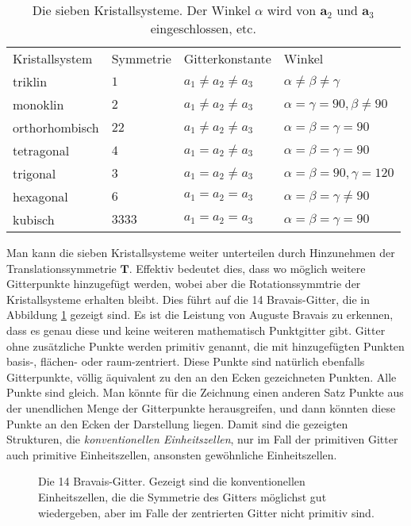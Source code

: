 \begin{table}
\begin{tabular}{llll}
Kristallsystem 	& 	Symmetrie & Gitterkonstante & Winkel \\
triklin 	&  	$1$						& $a_1 \neq a_2 \neq a_3$ &  $\alpha \neq \beta \neq \gamma$\\
monoklin 	& 	 $2$ 					& $a_1 \neq a_2 \neq a_3$ &  $\alpha = \gamma = 90, \beta \neq 90$\\
orthorhombisch 	& 	  $22$  & $a_1 \neq a_2 \neq a_3$ &  $\alpha= \beta =  \gamma = 90$\\
%
tetragonal 	&  $4$ & $a_1 = a_2 \neq a_3$ &   $\alpha= \beta =  \gamma = 90$\\
trigonal 	& 	 $3$ & $a_1 = a_2 \neq a_3$ &  $\alpha = \beta = 90, \gamma = 120$\\
hexagonal 	& 	  $6$  & $a_1 = a_2 = a_3$ &  $\alpha = \beta = \gamma \neq 90$\\
kubisch 	&  	$3333$  & $a_1= a_2=  a_3$ &  $\alpha= \beta =  \gamma = 90$\\
\end{tabular}
\caption{Die sieben Kristallsysteme. 
 Der Winkel $\alpha$ wird von $\mathbf{a}_2$ und  $\mathbf{a}_3$  eingeschlossen, etc.}
\end{table}


Man kann die sieben Kristallsysteme weiter unterteilen durch Hinzunehmen der Translationssymmetrie $\mathbf{T}$. Effektiv bedeutet dies, dass wo möglich weitere Gitterpunkte hinzugefügt werden, wobei aber die  Rotationssymmtrie der Kristallsysteme erhalten bleibt. 
Dies führt auf die 14 Bravais-Gitter, die in Abbildung \ref{fig:gitter_bravais14} gezeigt sind. Es ist die Leistung von Auguste Bravais zu erkennen, dass es genau diese und keine weiteren mathematisch Punktgitter gibt. Gitter ohne zusätzliche Punkte werden primitiv genannt, die mit hinzugefügten Punkten basis-, flächen- oder raum-zentriert. Diese Punkte sind natürlich ebenfalls Gitterpunkte, völlig äquivalent zu den an den Ecken gezeichneten Punkten. Alle Punkte sind gleich. Man könnte für die Zeichnung einen anderen Satz Punkte aus der unendlichen Menge der Gitterpunkte herausgreifen, und dann könnten diese Punkte an den Ecken der Darstellung liegen. Damit sind die gezeigten Strukturen, die \emph{konventionellen Einheitszellen}, nur im Fall der primitiven Gitter auch primitive Einheitszellen, ansonsten gewöhnliche  Einheitszellen.



\begin{figure}



\caption{Die 14 Bravais-Gitter. \label{fig:gitter_bravais14}  Gezeigt sind die konventionellen Einheitszellen, die die Symmetrie  des Gitters möglichst gut wiedergeben, aber im Falle der zentrierten Gitter nicht primitiv sind.
}
\end{figure}


